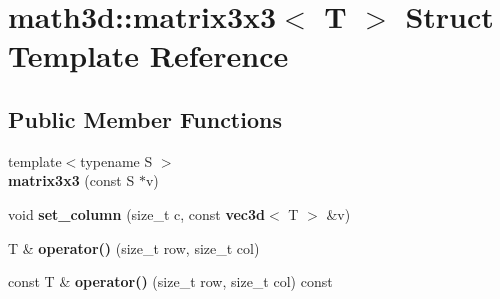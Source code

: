 \section{math3d\-:\-:matrix3x3$<$ T $>$ Struct Template Reference}
\label{structmath3d_1_1matrix3x3}
\subsection*{Public Member Functions}
\begin{DoxyCompactItemize}
\item 
{\footnotesize template$<$typename S $>$ }\\{\bfseries matrix3x3} (const S $\ast$v)\label{structmath3d_1_1matrix3x3_ac1fb0ad557c9832b9030a750e9f4f1c2}

\item 
void {\bfseries set\-\_\-column} (size\-\_\-t c, const {\bf vec3d}$<$ T $>$ \&v)\label{structmath3d_1_1matrix3x3_a643494c19abf98c49ac97a6724861ae6}

\item 
T \& {\bfseries operator()} (size\-\_\-t row, size\-\_\-t col)\label{structmath3d_1_1matrix3x3_a69c918004fa5ad6d2638864b52afc4e4}

\item 
const T \& {\bfseries operator()} (size\-\_\-t row, size\-\_\-t col) const \label{structmath3d_1_1matrix3x3_ac61393143b2196f9e79f79e274e57706}

\end{DoxyCompactItemize}
